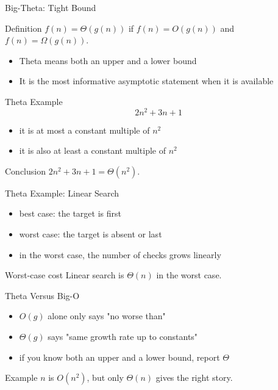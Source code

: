 \documentclass[aspectratio=169,xcolor=dvipsnames]{beamer}
\begin{document}
\begin{frame}{Big-Theta: Tight Bound}
  \begin{block}{Definition}
    $f(n) = \Theta(g(n))$ if $f(n) = O(g(n))$ and $f(n) = \Omega(g(n))$.
  \end{block}
  \begin{itemize}
    \item Theta means both an upper and a lower bound
    \item It is the most informative asymptotic statement when it is available
  \end{itemize}
\end{frame}

\begin{frame}{Theta Example}
  \[
    2n^2 + 3n + 1
  \]
  \begin{itemize}
    \item it is at most a constant multiple of $n^2$
    \item it is also at least a constant multiple of $n^2$
  \end{itemize}
  \begin{block}{Conclusion}
    $2n^2 + 3n + 1 = \Theta(n^2)$.
  \end{block}
\end{frame}

\begin{frame}{Theta Example: Linear Search}
  \begin{itemize}
    \item best case: the target is first
    \item worst case: the target is absent or last
    \item in the worst case, the number of checks grows linearly
  \end{itemize}
  \begin{block}{Worst-case cost}
    Linear search is $\Theta(n)$ in the worst case.
  \end{block}
\end{frame}

\begin{frame}{Theta Versus Big-O}
  \begin{itemize}
    \item $O(g)$ alone only says "no worse than"
    \item $\Theta(g)$ says "same growth rate up to constants"
    \item if you know both an upper and a lower bound, report $\Theta$
  \end{itemize}
  \begin{exampleblock}{Example}
    $n$ is $O(n^2)$, but only $\Theta(n)$ gives the right story.
  \end{exampleblock}
\end{frame}
\end{document}
